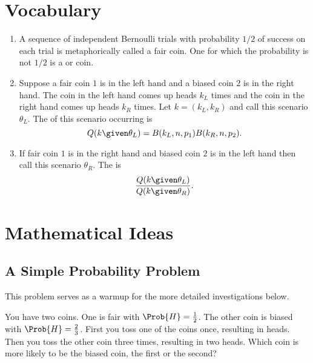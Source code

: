 \documentclass[12pt]{article}
\begin{document}
\hr

\section*{Vocabulary}
\begin{enumerate}
    \item
        A sequence of independent Bernoulli trials with probability \(
        1/2 \) of success on each trial is metaphorically called a 
        {fair} coin.  One for which the probability is not \( 1/2 \) is
        a  or  coin.
    \item
        Suppose a fair coin \( 1 \) is in the left hand and a biased
        coin \( 2 \) is in the right hand.  The coin in the left hand
        comes up heads \( k_L \) times and the coin in the right hand
        comes up heads \( k_R \) times.  Let \( k = (k_L, k_R) \) and
        call this scenario \( \theta_L \).  The  of
        this scenario occurring is
        \[
            Q(k \given \theta_L) = B(k_L, n, p_1)B(k_R, n, p_2).
        \]
    \item
        If fair coin \( 1 \) is in the right hand and biased coin \( 2 \)
        is in the left hand then call this scenario \( \theta_R \).  The
         is
        \[
            \frac{Q(k \given \theta_L)}{Q(k \given \theta_R)}.
        \]
\end{enumerate}

\hr

\section*{Mathematical Ideas}

\subsection*{A Simple Probability Problem}

This problem serves as a warmup for the more detailed investigations
below.

You have two coins.  One is fair with \( \Prob{H} = \frac{1}{2} \).  The
other coin is biased with \( \Prob{H} = \frac{2}{3} \).  First you toss
one of the coins once, resulting in heads.  Then you toss the other coin
three times, resulting in two heads.  Which coin is more likely to be
the biased coin, the first or the second?
\end{document}
